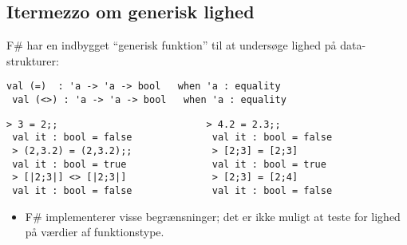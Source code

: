\documentclass[rgb]{beamer}
\begin{document}
\popmaketitleframe


\subsection{Itermezzo om generisk lighed}

\begin{frame}[fragile]
\begin{footnotesize}

  \vspace{1ex}

  F\# har en indbygget ``generisk funktion'' til at undersøge lighed på data-strukturer:
  \vspace{1ex}
\begin{lstlisting}[numbers=none,frame=none,mathescape]
 val (=)  : 'a -> 'a -> bool   when 'a : equality
 val (<>) : 'a -> 'a -> bool   when 'a : equality
\end{lstlisting}
  \vspace{1ex}

  \vspace{1ex}

\begin{lstlisting}[numbers=none,frame=none,mathescape]
 > 3 = 2;;                          > 4.2 = 2.3;;
 val it : bool = false              val it : bool = false
 > (2,3.2) = (2,3.2);;              > [2;3] = [2;3]
 val it : bool = true               val it : bool = true
 > [|2;3|] <> [|2;3|]               > [2;3] = [2;4]
 val it : bool = false              val it : bool = false
\end{lstlisting}

  \vspace{1ex}

  \begin{itemize}
  \item F\# implementerer visse begrænsninger; det er ikke muligt at
    teste for lighed på værdier af funktionstype.
  \end{itemize}

\end{footnotesize}
\end{frame}
\end{document}
